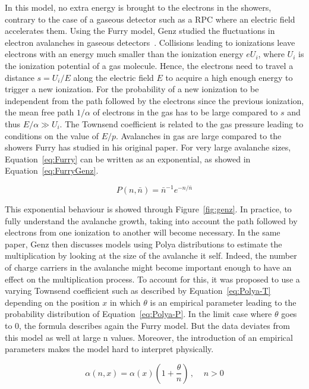 	In this model, no extra energy is brought to the electrons in the showers, contrary to the case of a gaseous detector such as a RPC where an electric field accelerates them. Using the Furry model, Genz studied the fluctuations in electron avalanches in gaseous detectors~\cite{GENZ1973}. Collisions leading to ionizations leave electrons with an energy much smaller than the ionization energy $eU_i$, where $U_i$ is the ionization potential of a gas molecule. Hence, the electrons need to travel a distance $s = U_i/E$ along the electric field $E$ to acquire a high enough energy to trigger a new ionization. For the probability of a new ionization to be independent from the path followed by the electrons since the previous ionization, the mean free path $1/\alpha$ of electrons in the gas has to be large compared to $s$ and thus $E/\alpha \gg U_i$. The Townsend coefficient is related to the gas pressure leading to conditions on the value of $E/p$. Avalanches in gas are large compared to the showers Furry has studied in his original paper. For very large avalanche sizes, Equation~\ref{eq:Furry} can be written as an exponential, as showed in Equation~\ref{eq:FurryGenz}.
	
	\begin{equation}
	\label{eq:FurryGenz}
	P(n,\bar{n}) = \bar{n}^{-1} e^{-n/\bar{n}}
	\end{equation}
	
	This exponential behaviour is showed through Figure~\ref{fig:genz}. In practice, to fully understand the avalanche growth, taking into account the path followed by electrons from one ionization to another will become necessary. In the same paper, Genz then discusses models using Polya distributions to estimate the multiplication by looking at the size of the avalanche it self. Indeed, the number of charge carriers in the avalanche might become important enough to have an effect on the multiplication process. To account for this, it was proposed to use a varying Townsend coefficient such as described by Equation~\ref{eq:Polya-T} depending on the position $x$ in which $\theta$ is an empirical parameter leading to the probability distribution of Equation~\ref{eq:Polya-P}. In the limit case where $\theta$ goes to 0, the formula describes again the Furry model. But the data deviates from this model as well at large n values. Moreover, the introduction of an empirical parameters makes the model hard to interpret physically.
	
	\begin{equation}
	\label{eq:Polya-T}
	\alpha(n,x) = \alpha(x) \left( 1 + \frac{\theta}{n} \right) \, , \;\;\;\; n > 0
	\end{equation}
	

